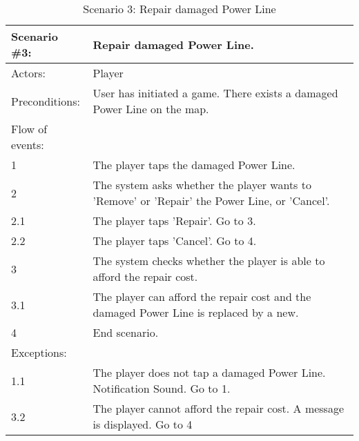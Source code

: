 \begin{table}
	\begin{tabular}{| l | p{10cm} |}
		\hline
		\rowcolor{lightgray}
		{\bf Scenario \#3:} & {\bf Repair damaged Power Line.} \\ \hline
		Actors: & Player \\ \hline
		Preconditions: & User has initiated a game. There exists a damaged Power Line on the map. \\ \hline
		\rowcolor{lightergray}
		Flow of events: & \\ \hline
		1 & The player taps the damaged Power Line. \\ \hline
		2 & The system asks whether the player wants to 'Remove' or 'Repair' the Power Line, or 'Cancel'. \\ \hline
		2.1 & The player taps 'Repair'. Go to 3. \\ \hline
		2.2 & The player taps 'Cancel'. Go to 4. \\ \hline
		3 & The system checks whether the player is able to afford the repair cost. \\ \hline
		3.1 & The player can afford the repair cost and the damaged Power Line is replaced by a new. \\ \hline
		4 & End scenario. \\ \hline
		\rowcolor{lightergray}
		Exceptions: & \\ \hline
		1.1 & The player does not tap a damaged Power Line. Notification Sound. Go to 1. \\ \hline
		3.2 & The player cannot afford the repair cost. A message is displayed. Go to 4 \\ \hline
	\end{tabular}
\caption{Scenario 3: Repair damaged Power Line}
\end{table}

